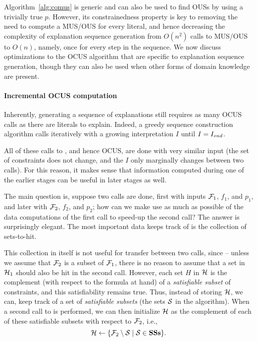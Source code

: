 Algorithm~\ref{alg:comus} is generic and can also be used to find OUSs by using a trivially true $p$. %
However, its constrainedness property is key to removing the need to compute a MUS/OUS for every literal, and hence decreasing the complexity of explanation sequence generation from $O(n^2)$ calls to MUS/OUS to $O(n)$, namely, once for every step in the sequence.
 We now discuss optimizations to the OCUS algorithm that are specific to explanation sequence generation, though they can also be used when other forms of domain knowledge are present. 
 
\paragraph{Incremental OCUS computation}
Inherently, generating a sequence of explanations still requires as many OCUS calls as there are literals to explain. 
Indeed, a greedy sequence construction algorithm %
calls \onestepo iteratively with a growing interpretation $I$ until $I=I_\mathit{end} $.

All of these calls to \onestepo, and hence OCUS, are done with very similar input (the set of constraints does not change, and the $I$ only marginally changes between two calls). For this reason, it makes sense that information computed during one of the earlier stages can be useful in later stages as well. 

The main question is, suppose two \comus calls are done, first with inputs $\mathcal{F} _1$, $f_1$, and $p_1$, and later with $\mathcal{F} _2$, $f_2$, and $p_2$; how can we make use as much as possible of the data computations of the first call to speed-up the second call? The answer is surprisingly elegant. The most important data \comus keeps track of  is the collection \setstohit of sets-to-hit.

This collection in itself is not useful for transfer between two calls, since -- unless we assume that $\mathcal{F} _2$ is a subset of $\mathcal{F} _1$, there is no reason to assume that a set in $\mathcal{H} _1$ should also be hit in the second call. 
However, each set $H$ in $\mathcal{H} $ is the complement (with respect to the formula at hand) of a \emph{satisfiable subset} of constraints, and this satisfiability remains true. 
Thus, instead of storing $\mathcal{H} $, we can, keep track of a set \satsets of \emph{satisfiable subsets} (the sets $\mathcal{S}$ in the \comus algorithm). 
When a second call to \comus is performed, we can then initialize $\mathcal{H} $ as the complement of each of these satisfiable subsets with respect to $\mathcal{F} _2$, i.e., \[\mathcal{H} \gets \{\mathcal{F} _2\setminus \mathcal{S}\mid \mathcal{S}\in \mathbf{SSs}\}.\]

